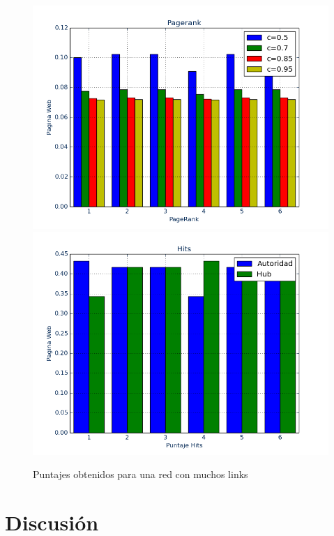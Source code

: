 \documentclass[a4paper]{article}
\begin{document}
\begin{figure}[htbp]
\centering
\includegraphics[scale=0.385]{img/muchoslinksout.png}
\includegraphics[scale=0.385]{img/muchoslinksoutH.png}
\caption{Puntajes obtenidos para una red con muchos links}
\end{figure}

\newpage
\section{Discusi\'{o}n}
\label{sec:discusion}
\end{document}
